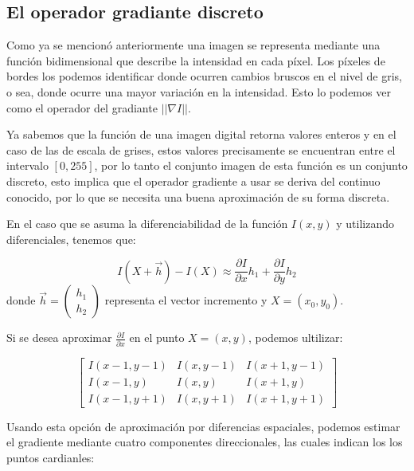 \documentclass[a4paper,10pt,twocolumn]{article}
\begin{document}
\subsection{El operador gradiante discreto}\label{sec:operador_gradiente}

Como ya se mencion\'o anteriormente una imagen se representa mediante una funci\'on bidimensional que describe la intensidad en cada p\'ixel. Los p\'ixeles de bordes los podemos identificar donde ocurren cambios bruscos en el nivel de gris, o sea, donde ocurre una mayor variaci\'on en la intensidad. Esto lo podemos ver como el operador del gradiante $||\nabla I||$.

Ya sabemos que la funci\'on de una imagen digital retorna valores enteros y en el caso de las de escala de grises, estos valores precisamente se encuentran entre el intervalo $\left[ 0, 255 \right] $, por lo tanto el conjunto imagen de esta funci\'on es un conjunto discreto, esto implica que el operador gradiente a usar se deriva del continuo conocido, por lo que se necesita una buena aproximaci\'on de su forma discreta.

En el caso que se asuma la diferenciabilidad de la funci\'on $I(x,y)$ y utilizando diferenciales, tenemos que:

\begin{equation}
	I(X + \vec{h}) - I(X) \approx \frac{\partial I}{\partial x}h_1 + \frac{\partial I}{\partial y}h_2
\end{equation}
donde $\vec{h} =\left ( \begin{array}{c} h_1 \\ h_2 \end{array} \right )$ representa el vector incremento y $X = (x_0, y_0)$.

Si se desea aproximar $\frac{\partial I}{\partial x}$ en el punto $X = (x,y)$, podemos ultilizar:

\begin{equation}
	\left [ \begin{array}{ccc} 
		I(x-1, y-1) & I(x, y-1) & I(x+1, y-1) \\
		I(x-1, y)   & I(x, y)   & I(x+1, y) \\
		I(x-1, y+1) & I(x, y+1) & I(x+1, y+1) 
	\end{array} \right ]
\end{equation}

Usando esta opci\'on de aproximaci\'on por diferencias espaciales, podemos estimar el gradiente mediante cuatro componentes direccionales, las cuales indican los los puntos cardianles:
\end{document}
